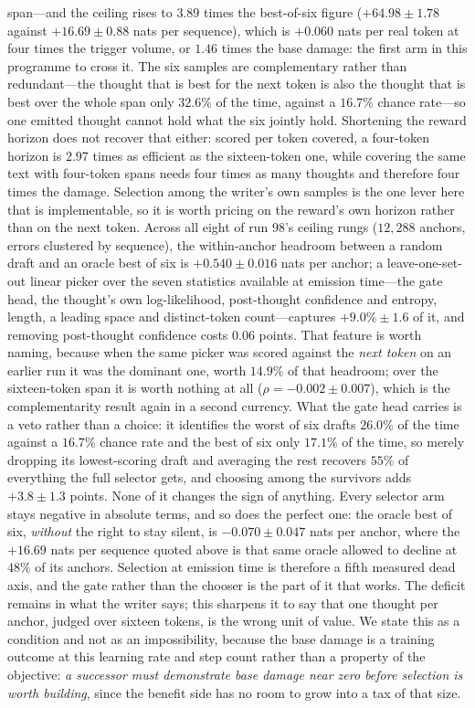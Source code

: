 \documentclass{article} %
\begin{document}
span---and the ceiling rises to $3.89$ times the best-of-six figure ($+64.98 \pm 1.78$ against $+16.69 \pm 0.88$ nats per sequence), which is $+0.060$ nats per real token at four times the trigger volume, or $1.46$ times the base damage: the first arm in this programme to cross it. The six samples are complementary rather than redundant---the thought that is best for the next token is also the thought that is best over the whole span only $32.6\%$ of the time, against a $16.7\%$ chance rate---so one emitted thought cannot hold what the six jointly hold. Shortening the reward horizon does not recover that either: scored per token covered, a four-token horizon is $2.97$ times as efficient as the sixteen-token one, while covering the same text with four-token spans needs four times as many thoughts and therefore four times the damage. Selection among the writer's own samples is the one lever here that is implementable, so it is worth pricing on the reward's own horizon rather than on the next token. Across all eight of run 98's ceiling rungs ($12{,}288$ anchors, errors clustered by sequence), the within-anchor headroom between a random draft and an oracle best of six is $+0.540 \pm 0.016$ nats per anchor; a leave-one-set-out linear picker over the seven statistics available at emission time---the gate head, the thought's own log-likelihood, post-thought confidence and entropy, length, a leading space and distinct-token count---captures $+9.0\% \pm 1.6$ of it, and removing post-thought confidence costs $0.06$ points. That feature is worth naming, because when the same picker was scored against the \emph{next token} on an earlier run it was the dominant one, worth $14.9\%$ of that headroom; over the sixteen-token span it is worth nothing at all ($\rho = -0.002 \pm 0.007$), which is the complementarity result again in a second currency. What the gate head carries is a veto rather than a choice: it identifies the worst of six drafts $26.0\%$ of the time against a $16.7\%$ chance rate and the best of six only $17.1\%$ of the time, so merely dropping its lowest-scoring draft and averaging the rest recovers $55\%$ of everything the full selector gets, and choosing among the survivors adds $+3.8 \pm 1.3$ points. None of it changes the sign of anything. Every selector arm stays negative in absolute terms, and so does the perfect one: the oracle best of six, \emph{without} the right to stay silent, is $-0.070 \pm 0.047$ nats per anchor, where the $+16.69$ nats per sequence quoted above is that same oracle allowed to decline at $48\%$ of its anchors. Selection at emission time is therefore a fifth measured dead axis, and the gate rather than the chooser is the part of it that works. The deficit remains in what the writer says; this sharpens it to say that one thought per anchor, judged over sixteen tokens, is the wrong unit of value. We state this as a condition and not as an impossibility, because the base damage is a training outcome at this learning rate and step count rather than a property of the objective: \emph{a successor must demonstrate base damage near zero before selection is worth building}, since the benefit side has no room to grow into a tax of that size.
\end{document}
